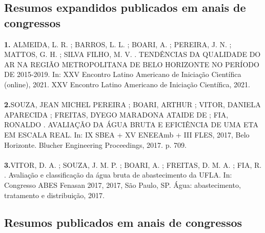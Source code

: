 \documentclass[12pt,a4paper,sans]{moderncv}        %
\begin{document}
	\subsection*{Resumos expandidos publicados em anais de congressos}
	
	\textbf{1.} ALMEIDA, L. R. ; BARROS, L. L. ; BOARI, A. ; PEREIRA, J. N. ; MATTOS, G. H. ; SILVA FILHO, M. V. . TENDÊNCIAS DA QUALIDADE DO AR NA REGIÃO METROPOLITANA DE BELO HORIZONTE NO PERÍODO DE 2015-2019. In: XXV Encontro Latino Americano de Iniciação Científica (online), 2021. XXV Encontro Latino Americano de Iniciação Científica, 2021.
	\\\\
	\textbf{2.}SOUZA, JEAN MICHEL PEREIRA ; BOARI, ARTHUR ; VITOR, DANIELA APARECIDA ; FREITAS, DYEGO MARADONA ATAIDE DE ; FIA, RONALDO . AVALIAÇÃO DA ÁGUA BRUTA E EFICIÊNCIA DE UMA ETA EM ESCALA REAL. In: IX SBEA + XV ENEEAmb + III FLES, 2017, Belo Horizonte. Blucher Engineering Proceedings, 2017. p. 709.
	\\\\
	\textbf{3.}VITOR, D. A. ; SOUZA, J. M. P. ; BOARI, A. ; FREITAS, D. M. A. ; FIA, R. . Avaliação e classificação da água bruta de abastecimento da UFLA. In: Congresso ABES Fenasan 2017, 2017, São Paulo, SP. Água: abastecimento, tratamento e distribuição, 2017.
	
	\subsection*{Resumos publicados em anais de congressos}
	
\end{document}
